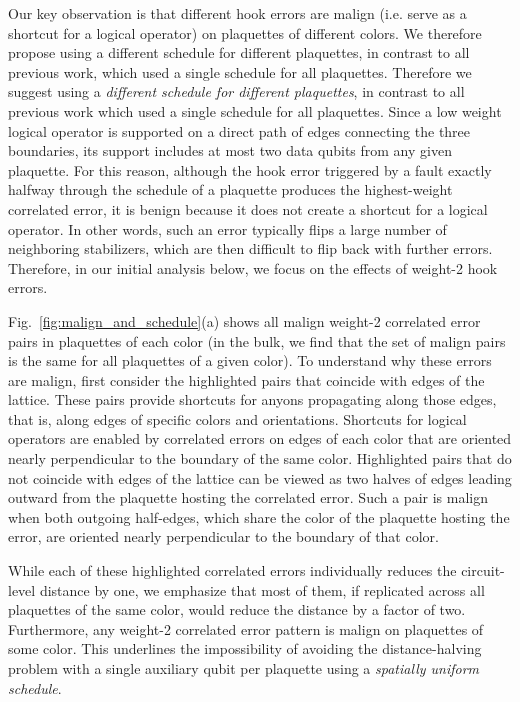 \documentclass[twocolumn,
aps,
prx,
showpacs,
amsmath,
amssymb,
floatfix,
longbibliography,
superscriptaddress,
eprint]
{revtex4-1}
\begin{document}
Our key observation is that different hook errors are malign (i.e. serve as a shortcut for a logical operator) on plaquettes of different colors.
We therefore propose using a different schedule for different plaquettes, in contrast to all previous work, which used a single schedule for all plaquettes.
Therefore we suggest using a {\it different schedule for different plaquettes}, in contrast to all previous work which used a single schedule for all plaquettes.
Since a low weight logical operator is supported on a direct path of edges connecting the three boundaries, its support includes at most two data qubits from any given plaquette.
For this reason, although the hook error triggered by a fault exactly halfway through the schedule of a plaquette produces the highest-weight correlated error, it is benign because it does not create a shortcut for a logical operator.
In other words, such an error typically flips a large number of neighboring stabilizers, which are then difficult to flip back with further errors.
Therefore, in our initial analysis below, we focus on the effects of weight-2 hook errors.

Fig.~\ref{fig:malign_and_schedule}(a) shows all malign weight-2 correlated error pairs in plaquettes of each color (in the bulk, we find that the set of malign pairs is the same for all plaquettes of a given color).
To understand why these errors are malign, first consider the highlighted pairs that coincide with edges of the lattice.
These pairs provide shortcuts for anyons propagating along those edges, that is, along edges of specific colors and orientations.
Shortcuts for logical operators are enabled by correlated errors on edges of each color that are oriented nearly perpendicular to the boundary of the same color.
Highlighted pairs that do not coincide with edges of the lattice can be viewed as two halves of edges leading outward from the plaquette hosting the correlated error.
Such a pair is malign when both outgoing half-edges, which share the color of the plaquette hosting the error, are oriented nearly perpendicular to the boundary of that color.

While each of these highlighted correlated errors individually reduces the circuit-level distance by one, we emphasize that most of them, if replicated across all plaquettes of the same color, would reduce the distance by a factor of two.
Furthermore, any weight-2 correlated error pattern is malign on plaquettes of some color.
This underlines the impossibility of avoiding the distance-halving problem with a single auxiliary qubit per plaquette using a {\it spatially uniform schedule}.
\end{document}
